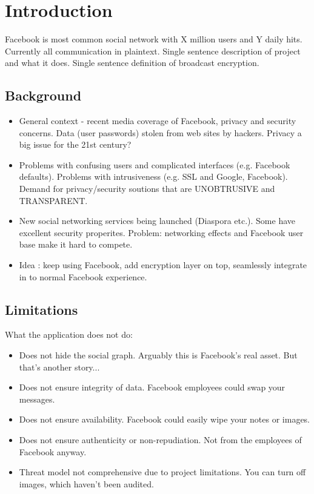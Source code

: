 \chapter{Introduction}\label{ch:introduction}

Facebook is most common social network with X million users and Y daily hits. Currently all communication in plaintext. Single sentence description of project and what it does. Single sentence definition of broadcast encryption.

\section{Background}

\begin{itemize}

    \item General context - recent media coverage of Facebook, privacy and security concerns. Data (user passwords) stolen from web sites by hackers. Privacy a big issue for the 21st century?
  
    \item Problems with confusing users and complicated interfaces (e.g. Facebook defaults). Problems with intrusiveness (e.g. SSL and Google, Facebook). Demand for privacy/security soutions that are UNOBTRUSIVE and TRANSPARENT.

    \item New social networking services being launched (Diaspora etc.). Some have excellent security properites. Problem: networking effects and Facebook user base make it hard to compete.
    
    \item Idea : keep using Facebook, add encryption layer on top, seamlessly integrate in to normal Facebook experience.
    
\end{itemize}

\section{Limitations}

What the application does not do:
\begin{itemize}
    \item Does not hide the social graph. Arguably this is Facebook's real asset. But that's another story...
    \item Does not ensure integrity of data. Facebook employees could swap your messages.
    \item Does not ensure availability. Facebook could easily wipe your notes or images.
    \item Does not ensure authenticity or non-repudiation. Not from the employees of Facebook anyway.
    \item Threat model not comprehensive due to project limitations. You can turn off images, which haven't been audited.
\end{itemize}


